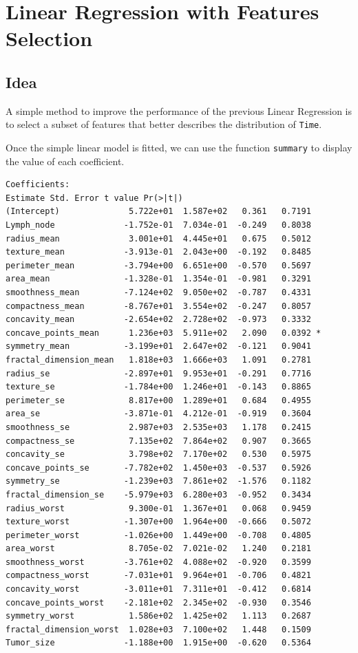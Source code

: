 \documentclass[]{report}
\begin{document}
\section{Linear Regression with Features Selection}
\subsection{Idea}
A simple method to improve the performance of the previous Linear Regression is to select a subset of features that better describes the distribution of \texttt{Time}.

Once the simple linear model is fitted, we can use the function \texttt{summary} to display the value of each coefficient.
\begin{verbatim}
Coefficients:
Estimate Std. Error t value Pr(>|t|)  
(Intercept)              5.722e+01  1.587e+02   0.361   0.7191  
Lymph_node              -1.752e-01  7.034e-01  -0.249   0.8038  
radius_mean              3.001e+01  4.445e+01   0.675   0.5012  
texture_mean            -3.913e-01  2.043e+00  -0.192   0.8485  
perimeter_mean          -3.794e+00  6.651e+00  -0.570   0.5697  
area_mean               -1.328e-01  1.354e-01  -0.981   0.3291  
smoothness_mean         -7.124e+02  9.050e+02  -0.787   0.4331  
compactness_mean        -8.767e+01  3.554e+02  -0.247   0.8057  
concavity_mean          -2.654e+02  2.728e+02  -0.973   0.3332  
concave_points_mean      1.236e+03  5.911e+02   2.090   0.0392 *
symmetry_mean           -3.199e+01  2.647e+02  -0.121   0.9041  
fractal_dimension_mean   1.818e+03  1.666e+03   1.091   0.2781  
radius_se               -2.897e+01  9.953e+01  -0.291   0.7716  
texture_se              -1.784e+00  1.246e+01  -0.143   0.8865  
perimeter_se             8.817e+00  1.289e+01   0.684   0.4955  
area_se                 -3.871e-01  4.212e-01  -0.919   0.3604  
smoothness_se            2.987e+03  2.535e+03   1.178   0.2415  
compactness_se           7.135e+02  7.864e+02   0.907   0.3665  
concavity_se             3.798e+02  7.170e+02   0.530   0.5975  
concave_points_se       -7.782e+02  1.450e+03  -0.537   0.5926  
symmetry_se             -1.239e+03  7.861e+02  -1.576   0.1182  
fractal_dimension_se    -5.979e+03  6.280e+03  -0.952   0.3434  
radius_worst             9.300e-01  1.367e+01   0.068   0.9459  
texture_worst           -1.307e+00  1.964e+00  -0.666   0.5072  
perimeter_worst         -1.026e+00  1.449e+00  -0.708   0.4805  
area_worst               8.705e-02  7.021e-02   1.240   0.2181  
smoothness_worst        -3.761e+02  4.088e+02  -0.920   0.3599  
compactness_worst       -7.031e+01  9.964e+01  -0.706   0.4821  
concavity_worst         -3.011e+01  7.311e+01  -0.412   0.6814  
concave_points_worst    -2.181e+02  2.345e+02  -0.930   0.3546  
symmetry_worst           1.586e+02  1.425e+02   1.113   0.2687  
fractal_dimension_worst  1.028e+03  7.100e+02   1.448   0.1509  
Tumor_size              -1.188e+00  1.915e+00  -0.620   0.5364  
\end{verbatim}
\end{document}
